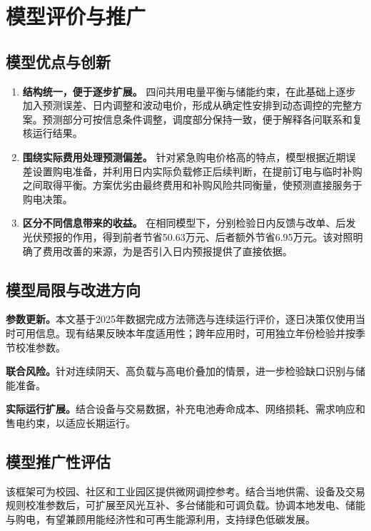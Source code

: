 \section{模型评价与推广}

\subsection{模型优点与创新}

\begin{enumerate}
    \item \textbf{结构统一，便于逐步扩展。}
    四问共用电量平衡与储能约束，在此基础上逐步加入预测误差、日内调整和波动电价，形成从确定性安排到动态调控的完整方案。预测部分可按信息条件调整，调度部分保持一致，便于解释各问联系和复核运行结果。

    \item \textbf{围绕实际费用处理预测偏差。}
    针对紧急购电价格高的特点，模型根据近期误差设置购电准备，并利用日内实际负载修正后续判断，在提前订电与临时补购之间取得平衡。方案优劣由最终费用和补购风险共同衡量，使预测直接服务于购电决策。

    \item \textbf{区分不同信息带来的收益。}
    在相同模型下，分别检验日内反馈与改单、后发光伏预报的作用，得到前者节省50.63万元、后者额外节省6.95万元。该对照明确了费用改善的来源，为是否引入日内预报提供了直接依据。
\end{enumerate}

\subsection{模型局限与改进方向}

\textbf{参数更新。}本文基于2025年数据完成方法筛选与连续运行评价，逐日决策仅使用当时可用信息。现有结果反映本年度适用性；跨年应用时，可用独立年份检验并按季节校准参数。

\textbf{联合风险。}针对连续阴天、高负载与高电价叠加的情景，进一步检验缺口识别与储能准备。

\textbf{实际运行扩展。}结合设备与交易数据，补充电池寿命成本、网络损耗、需求响应和售电约束，以适应长期运行。

\subsection{模型推广性评估}

该框架可为校园、社区和工业园区提供微网调控参考。结合当地供需、设备及交易规则校准参数后，可扩展至风光互补、多台储能和可调负载。协调本地发电、储能与购电，有望兼顾用能经济性和可再生能源利用，支持绿色低碳发展。

